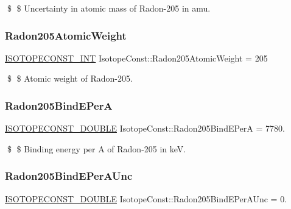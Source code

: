 \$ \$ Uncertainty in atomic mass of Radon-\/205 in amu. \mbox{\label{group___isotope_const-_radon-_rn205_ga55e746c24f024593173c4d4190121607}} 
\subsubsection{\texorpdfstring{Radon205\+Atomic\+Weight}{Radon205AtomicWeight}}
{\footnotesize\ttfamily \mbox{\hyperlink{group___isotope_const-_macros_ga5f18360b3e99483a35c32d789e62621c}{I\+S\+O\+T\+O\+P\+E\+C\+O\+N\+S\+T\+\_\+\+I\+NT}} Isotope\+Const\+::\+Radon205\+Atomic\+Weight = 205}

\$ \$ Atomic weight of Radon-\/205. \mbox{\label{group___isotope_const-_radon-_rn205_gabf20ab608bae12ca838589d98095aec8}} 
\subsubsection{\texorpdfstring{Radon205\+Bind\+E\+PerA}{Radon205BindEPerA}}
{\footnotesize\ttfamily \mbox{\hyperlink{group___isotope_const-_macros_ga8f45a7272ce02c0b4c65c44636ed719a}{I\+S\+O\+T\+O\+P\+E\+C\+O\+N\+S\+T\+\_\+\+D\+O\+U\+B\+LE}} Isotope\+Const\+::\+Radon205\+Bind\+E\+PerA = 7780.}

\$ \$ Binding energy per A of Radon-\/205 in keV. \mbox{\label{group___isotope_const-_radon-_rn205_ga027b169bdac416d73e501365e09290a3}} 
\subsubsection{\texorpdfstring{Radon205\+Bind\+E\+Per\+A\+Unc}{Radon205BindEPerAUnc}}
{\footnotesize\ttfamily \mbox{\hyperlink{group___isotope_const-_macros_ga8f45a7272ce02c0b4c65c44636ed719a}{I\+S\+O\+T\+O\+P\+E\+C\+O\+N\+S\+T\+\_\+\+D\+O\+U\+B\+LE}} Isotope\+Const\+::\+Radon205\+Bind\+E\+Per\+A\+Unc = 0.}

